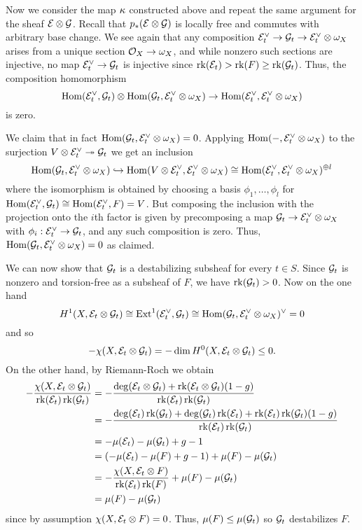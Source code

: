 \documentclass[letterpaper,12pt]{article}
\theoremstyle{remark}
\begin{document}
Now we consider the map $\kappa$ constructed above and repeat the same argument for the sheaf $\mathcal{E} \otimes \mathcal{G}$. Recall that $p_*(\mathcal{E} \otimes \mathcal{G})$ is locally free and commutes with arbitrary base change. We see again that any composition $\mathcal{E}_t^\vee \to \mathcal{G}_t \to \mathcal{E}_t^\vee \otimes \omega_X$ arises from a unique section $\mathcal{O}_X \to \omega_X$, and while nonzero such sections are injective, no map $\mathcal{E}_t^\vee \to \mathcal{G}_t$ is injective since $\operatorname{\mathrm{rk}}(\mathcal{E}_t) > \operatorname{\mathrm{rk}}(F) \ge \operatorname{\mathrm{rk}}(\mathcal{G}_t)$. Thus, the composition homomorphism
\[ \mathrm{Hom}(\mathcal{E}_t^\vee, \mathcal{G}_t) \otimes \mathrm{Hom}(\mathcal{G}_t, \mathcal{E}_t^\vee \otimes \omega_X) \to \mathrm{Hom}(\mathcal{E}_t^\vee, \mathcal{E}_t^\vee \otimes \omega_X) \]
is zero. 

We claim that in fact $\mathrm{Hom}(\mathcal{G}_t, \mathcal{E}_t^\vee \otimes \omega_X) = 0$. Applying $\mathrm{Hom}(-, \mathcal{E}_t^\vee \otimes \omega_X)$ to the surjection $V \otimes \mathcal{E}_t^\vee \twoheadrightarrow \mathcal{G}_t$ we get an inclusion
\[ \mathrm{Hom}(\mathcal{G}_t, \mathcal{E}_t^\vee \otimes \omega_X) \hookrightarrow \mathrm{Hom}(V \otimes \mathcal{E}_t^\vee, \mathcal{E}_t^\vee \otimes \omega_X) \cong \mathrm{Hom}(\mathcal{E}_t^\vee, \mathcal{E}_t^\vee \otimes \omega_X)^{\oplus l} \]
where the isomorphism is obtained by choosing a basis $\phi_1, \ldots, \phi_l$ for $\mathrm{Hom}(\mathcal{E}_t^\vee, \mathcal{G}_t) \cong \mathrm{Hom}(\mathcal{E}_t^\vee, F) = V$. But composing the inclusion with the projection onto the $i$th factor is given by precomposing a map $\mathcal{G}_t \to \mathcal{E}_t^\vee \otimes \omega_X$ with $\phi_i: \mathcal{E}_t^\vee \to \mathcal{G}_t$, and any such composition is zero. Thus, $\mathrm{Hom}(\mathcal{G}_t, \mathcal{E}_t^\vee \otimes \omega_X) = 0$ as claimed.

We can now show that $\mathcal{G}_t$ is a destabilizing subsheaf for every $t \in S$. Since $\mathcal{G}_t$ is nonzero and torsion-free as a subsheaf of $F$, we have $\operatorname{\mathrm{rk}}(\mathcal{G}_t) > 0$. Now on the one hand
\[ H^1(X, \mathcal{E}_t \otimes \mathcal{G}_t) \cong \mathrm{Ext}^1(\mathcal{E}_t^\vee, \mathcal{G}_t) \cong \mathrm{Hom}(\mathcal{G}_t, \mathcal{E}_t^\vee \otimes \omega_X)^\vee = 0 \]
and so
\[ -\chi(X, \mathcal{E}_t \otimes \mathcal{G}_t) = -\dim H^0(X, \mathcal{E}_t \otimes \mathcal{G}_t) \le 0. \]
On the other hand, by Riemann-Roch we obtain
\begin{align*}
    -\frac{\chi(X, \mathcal{E}_t \otimes \mathcal{G}_t)}{\operatorname{\mathrm{rk}}(\mathcal{E}_t) \operatorname{\mathrm{rk}}(\mathcal{G}_t)} & = -\frac{\deg(\mathcal{E}_t \otimes \mathcal{G}_t) + \operatorname{\mathrm{rk}}(\mathcal{E}_t \otimes \mathcal{G}_t)(1-g)}{\operatorname{\mathrm{rk}}(\mathcal{E}_t) \operatorname{\mathrm{rk}}(\mathcal{G}_t)} \\
    & = -\frac{\deg(\mathcal{E}_t)\operatorname{\mathrm{rk}}(\mathcal{G}_t) + \deg(\mathcal{G}_t)\operatorname{\mathrm{rk}}(\mathcal{E}_t) + \operatorname{\mathrm{rk}}(\mathcal{E}_t)\operatorname{\mathrm{rk}}(\mathcal{G}_t)(1-g)}{\operatorname{\mathrm{rk}}(\mathcal{E}_t) \operatorname{\mathrm{rk}}(\mathcal{G}_t)} \\
    & = -\mu(\mathcal{E}_t) - \mu(\mathcal{G}_t) + g - 1 \\
    & = (-\mu(\mathcal{E}_t) - \mu(F) + g - 1) + \mu(F) - \mu(\mathcal{G}_t) \\
    & = -\frac{\chi(X, \mathcal{E}_t \otimes F)}{\operatorname{\mathrm{rk}}(\mathcal{E}_t)\operatorname{\mathrm{rk}}(F)} + \mu(F) - \mu(\mathcal{G}_t) \\
    & = \mu(F) - \mu(\mathcal{G}_t)
\end{align*}
since by assumption $\chi(X, \mathcal{E}_t \otimes F) = 0$. Thus, $\mu(F) \le \mu(\mathcal{G}_t)$ so $\mathcal{G}_t$ destabilizes $F$.
\end{document}
